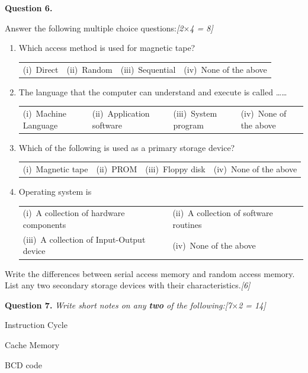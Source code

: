 \documentclass[11pt,a4paper]{article}
\newcommand{\pts}[1]{\hfill\textit{[#1]}}
\begin{document}
\noindent\textbf{Question 6.}
\begin{parts}
  \item Answer the following multiple choice questions:\pts{2$\times$4 = 8}
  \begin{enumerate}[label=(\roman*),leftmargin=*]
    \item Which access method is used for magnetic tape?\\
    \begin{tabular}{p{2.5cm}p{2.5cm}p{3cm}p{3cm}}
      (i)~Direct & (ii)~Random & (iii)~Sequential & (iv)~None of the above
    \end{tabular}
    
    \item The language that the computer can understand and execute is called \dots\dots\\
    \begin{tabular}{p{3.5cm}p{3.5cm}p{3cm}p{3cm}}
      (i)~Machine Language & (ii)~Application software & (iii)~System program & (iv)~None of the above
    \end{tabular}
    
    \item Which of the following is used as a primary storage device?\\
    \begin{tabular}{p{3cm}p{2.5cm}p{3cm}p{3cm}}
      (i)~Magnetic tape & (ii)~PROM & (iii)~Floppy disk & (iv)~None of the above
    \end{tabular}
    
    \item Operating system is\\
    \begin{tabular}{p{5.5cm}p{5.5cm}}
      (i)~A collection of hardware components & (ii)~A collection of software routines \\
      (iii)~A collection of Input-Output device & (iv)~None of the above
    \end{tabular}
  \end{enumerate}
  \item Write the differences between serial access memory and random access memory. List any two secondary storage devices with their characteristics.\pts{6}
\end{parts}

\bigskip

\noindent\textbf{Question 7.} \textit{Write short notes on any \textbf{two} of the following:}\pts{7$\times$2 = 14}
\begin{parts}
  \item Instruction Cycle
  \item Cache Memory
  \item BCD code
\end{parts}
\end{document}
